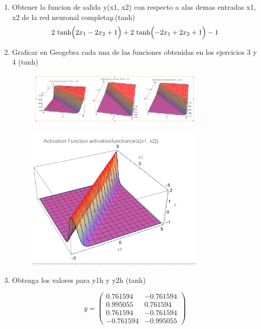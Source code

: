 \documentclass{article}
\begin{document}
\begin{flushleft}
\begin{enumerate}
  \item Obtener la funcion de salida y(x1, x2) con respecto a alas demas entradas x1, x2 de la red neuronal completa$y$.(tanh)
\[
2\,\tanh\Bigl(2x_1 - 2x_2 + 1\Bigr)
+ 2\,\tanh\Bigl(-2x_1 + 2x_2 + 1\Bigr)
- 1
\]
\item Graficar en Geogebra cada una de las funciones obtenidas en los ejercicios 3 y 4 (tanh)
\begin{figure}[H]
  \centering
  \includegraphics[width=0.8\textwidth]{4_e_tan.PNG}  %
\end{figure}
\begin{figure}[H]
  \centering
  \includegraphics[width=0.8\textwidth]{4_e_tan_final.PNG}  %
\end{figure}

\item Obtenga los valores para y1h y y2h (tanh)

\[
y = \begin{pmatrix}
0.761594 & -0.761594 \\
0.995055 & 0.761594 \\
0.761594 & -0.761594 \\
-0.761594 & -0.995055
\end{pmatrix}
\]


\end{enumerate}
\end{flushleft}
\end{document}
